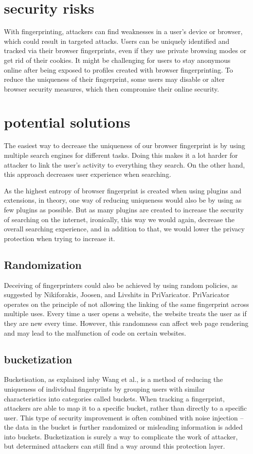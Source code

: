 \documentclass[10pt,a4paper,column]{article}
\begin{document}
\section{security risks}
With fingerprinting, attackers can find weaknesses in a user's device or browser, which could result in targeted attacks. Users can be uniquely identified and tracked via their browser fingerprints, even if they use private browsing modes or get rid of their cookies. It might be challenging for users to stay anonymous online after being exposed to profiles created with browser fingerprinting. To reduce the uniqueness of their fingerprint, some users may disable or alter browser security measures\cite{webtrackingMID}, which then compromise their online security.
\section{potential solutions}
The easiest way to decrease the uniqueness of our browser fingerprint is by using multiple search engines for different tasks. Doing this makes it a lot harder for attacker to link the user's activity to everything they search. On the other hand, this approach decreases user experience when searching.

As the highest entropy of browser fingerprint is created when using plugins and extensions, in theory, one way of reducing uniqueness would also be by using as few plugins as possible. But as many plugins are created to increase the security of searching on the internet, ironically, this way we would again, decrease the overall searching experience, and in addition to that, we would lower the privacy protection when trying to increase it.
\subsection{Randomization}
Deceiving of fingerprinters could also be achieved by using random policies, as suggested by Nikiforakis, Joosen, and Livshits in PriVaricator\cite{PriVaricator}. PriVaricator operates on the principle of not allowing the linking of the same fingerprint across multiple uses. Every time a user opens a website, the website treats the user as if they are new every time. However, this randomness can affect web page rendering and may lead to the malfunction of code on certain websites.
\subsection{bucketization}
Bucketisation, as explained in\cite{bucketization}by Wang et al., is a method of reducing the uniqueness of individual fingerprints by grouping users with similar characteristics into categories called buckets. When tracking a fingerprint, attackers are able to map it to a specific bucket, rather than directly to a specific user. This type of security improvement is often combined with noise injection – the data in the bucket is further randomized or misleading information is added into buckets. Bucketization is surely a way to complicate the work of attacker, but determined attackers can still find a way around this protection layer.
\end{document}
